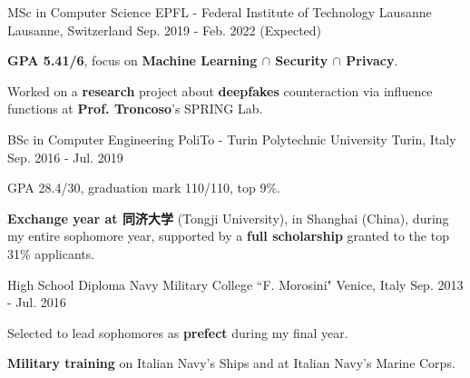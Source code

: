 

\begin{cventries}

  \cventry
    {MSc in Computer Science} %
    {EPFL - Federal Institute of Technology Lausanne} %
    {Lausanne, Switzerland} %
    {Sep. 2019 - Feb. 2022 (Expected)} %
    {
      \begin{cvitems} %
        \item \textbf{GPA 5.41/6}, focus on \textbf{Machine Learning $\cap$ Security $\cap$ Privacy}.
        \item Worked on a \textbf{research} project about \textbf{deepfakes} counteraction via influence functions at \textbf{Prof. Troncoso}'s SPRING Lab.
      \end{cvitems}
    }
    \cventry
    {BSc in Computer Engineering} %
    {PoliTo - Turin Polytechnic University} %
    {Turin, Italy} %
    {Sep. 2016 - Jul. 2019} %
    {
      \begin{cvitems} %
        \item GPA 28.4/30, graduation mark 110/110, top 9\%.
        \item \textbf{Exchange year at 同济大学} (Tongji University), in Shanghai (China), during my entire sophomore year, supported by a \textbf{full scholarship} granted to the top 31\% applicants. \vspace{0.2cm}
      \end{cvitems}
    }
    \cventry
    {High School Diploma} %
    {Navy Military College ``F. Morosini"} %
    {Venice, Italy} %
    {Sep. 2013 - Jul. 2016} %
    {
      \begin{cvitems} %
        \item Selected to lead sophomores as \textbf{prefect} during my final year.
        \item \textbf{Military training} on Italian Navy's Ships and at Italian Navy's Marine Corps.
      \end{cvitems}
    }

\end{cventries}
